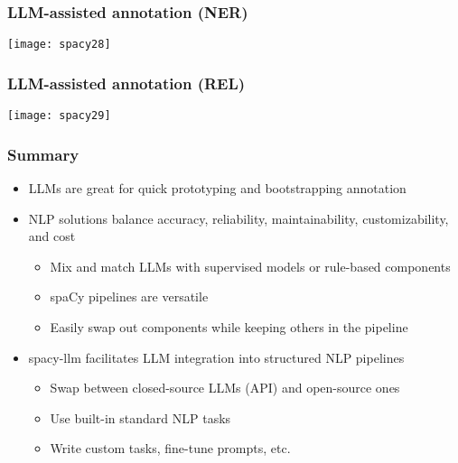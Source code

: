 \begin{frame}[fragile]\frametitle{LLM-assisted annotation (NER)}

\begin{center}
\texttt{[image: spacy28]}
\end{center}


\end{frame}

\begin{frame}[fragile]\frametitle{LLM-assisted annotation (REL)}

\begin{center}
\texttt{[image: spacy29]}
\end{center}


\end{frame}

\begin{frame}[fragile]\frametitle{Summary}
\begin{itemize}
\item LLMs are great for quick prototyping and bootstrapping annotation
\item NLP solutions balance accuracy, reliability, maintainability, customizability, and cost
\begin{itemize}
\item Mix and match LLMs with supervised models or rule-based components
\item spaCy pipelines are versatile
\item Easily swap out components while keeping others in the pipeline
\end{itemize}
\item spacy-llm facilitates LLM integration into structured NLP pipelines
\begin{itemize}
\item Swap between closed-source LLMs (API) and open-source ones
\item Use built-in standard NLP tasks
\item Write custom tasks, fine-tune prompts, etc.
\end{itemize}
\end{itemize}
\end{frame}